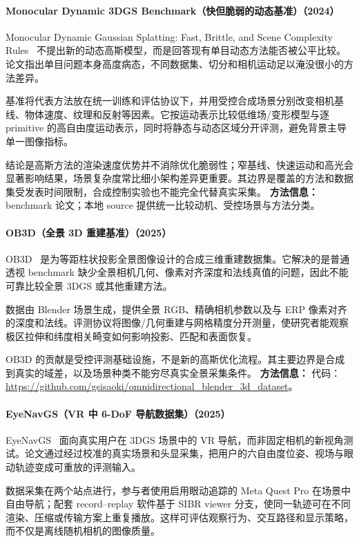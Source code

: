 \paragraph{Monocular Dynamic 3DGS Benchmark（快但脆弱的动态基准）（2024）}
Monocular Dynamic Gaussian Splatting: Fast, Brittle, and Scene Complexity Rules~\cite{2412_04457} 不提出新的动态高斯模型，而是回答现有单目动态方法能否被公平比较。论文指出单目问题本身高度病态，不同数据集、切分和相机运动足以淹没很小的方法差异。

基准将代表方法放在统一训练和评估协议下，并用受控合成场景分别改变相机基线、物体速度、纹理和反射等因素。它按运动表示比较低维场/变形模型与逐 primitive 的高自由度运动表示，同时将静态与动态区域分开评测，避免背景主导单一图像指标。

结论是高斯方法的渲染速度优势并不消除优化脆弱性；窄基线、快速运动和高光会显著影响结果，场景复杂度常比细小架构差异更重要。其边界是覆盖的方法和数据集受发表时间限制，合成控制实验也不能完全代替真实采集。
\textbf{方法信息：} benchmark 论文；本地 source 提供统一比较动机、受控场景与方法分类。
\paragraph{OB3D（全景 3D 重建基准）（2025）}
OB3D~\cite{2505_20126} 是为等距柱状投影全景图像设计的合成三维重建数据集。它解决的是普通透视 benchmark 缺少全景相机几何、像素对齐深度和法线真值的问题，因此不能可靠比较全景 3DGS 或其他重建方法。

数据由 Blender 场景生成，提供全景 RGB、精确相机参数以及与 ERP 像素对齐的深度和法线。评测协议将图像/几何重建与网格精度分开测量，使研究者能观察极区拉伸和纬度相关畸变如何影响投影、匹配和表面恢复。

OB3D 的贡献是受控评测基础设施，不是新的高斯优化流程。其主要边界是合成到真实的域差，以及场景种类不能穷尽真实全景采集条件。
\textbf{方法信息：} 代码：\url{https://github.com/gsisaoki/omnidirectional_blender_3d_dataset}。
\paragraph{EyeNavGS（VR 中 6-DoF 导航数据集）（2025）}
EyeNavGS~\cite{2506_02380} 面向真实用户在 3DGS 场景中的 VR 导航，而非固定相机的新视角测试。论文通过经过校准的真实场景和头显采集，把用户的六自由度位姿、视场与眼动轨迹变成可重放的评测输入。

数据采集在两个站点进行，参与者使用启用眼动追踪的 Meta Quest Pro 在场景中自由导航；配套 record--replay 软件基于 SIBR viewer 分支，使同一轨迹可在不同渲染、压缩或传输方案上重复播放。这样可评估观察行为、交互路径和显示策略，而不仅是离线随机相机的图像质量。

